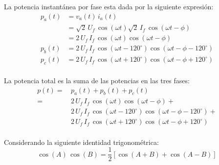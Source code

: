 \documentclass[letter,11pt]{article}
\begin{document}
\begin{enumerate}
La potencia instantánea por fase esta dada por la siguiente expresión:
\begin{equation*}
    \begin{split}
        p_a(t) &= v_a(t)\,i_a(t)\\
               &= \sqrt{2}\,U_f\,\cos(\omega{t})
                  \sqrt{2}\,I_f\,\cos(\omega{t}-\phi)\\
               &= 2\,U_f\,I_f\,\cos(\omega{t})\cos(\omega{t}-\phi)\\
        p_b(t) &= 2\,U_f\,I_f\,\cos(\omega{t}-120^{\circ})\cos(\omega{t}-\phi-120^{\circ})\\
        p_c(t) &= 2\,U_f\,I_f\,\cos(\omega{t}+120^{\circ})\cos(\omega{t}-\phi+120^{\circ})\\
    \end{split}
\end{equation*}

La potencia total es la suma de las potencias en las tres fases:
\begin{equation*}
    \begin{split}
        p(t) =\,& p_a(t)+p_b(t)+p_c(t)\\
             =\,& 2\,U_f\,I_f\,\cos(\omega{t})\cos(\omega{t}-\phi)+\\
                & 2\,U_f\,I_f\,\cos(\omega{t}-120^{\circ})\cos(\omega{t}-\phi-120^{\circ})+\\
                & 2\,U_f\,I_f\,\cos(\omega{t}+120^{\circ})\cos(\omega{t}-\phi+120^{\circ})\\
    \end{split}
\end{equation*}

Considerando la siguiente identidad trigonométrica:
\begin{equation*}
    \cos(A)\,\cos(B) = \frac{1}{2}\left[\cos(A+B)+\cos(A-B)\right]
\end{equation*}


\end{enumerate}
\end{document}

